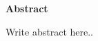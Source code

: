 \noindent
{\LARGE\textbf{Abstract}}

\vspace{0.5cm}

\begin{spacing}{1.03} 
\noindent
Write abstract here..

\end{spacing}